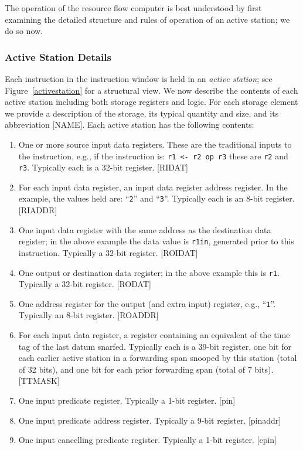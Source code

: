 \documentclass[10pt,dvips]{article}
\begin{document}
The operation of the resource flow computer is best understood by first
examining the detailed structure and rules of operation of an active station;
we do so now.


\subsubsection{Active Station Details}
Each instruction in the instruction window is held in an {\it active
station}; see Figure~\ref{activestation} for a structural view. We now describe the
contents of each active station including both storage registers and logic. For each
storage element we provide a description of the storage, its typical quantity and
size, and its abbreviation [NAME].
Each active station has the following contents:
\begin{enumerate}
\item One or more source input data registers. These are the traditional inputs to the
instruction, e.g., if the instruction is: {\tt r1 <- r2 op r3} these are {\tt r2}
and {\tt r3}.
Typically each is a 32-bit register.
[RIDAT]
\item For each input data register, an input data register address register. In the
example, the values held are: ``{\tt 2}'' and ``{\tt 3}''.
Typically each is an 8-bit register. [RIADDR]
\item One input data register with the same address as the destination data register;
in the above example the data value is {\tt r1in}, generated prior to
this instruction. Typically a 32-bit register. [ROIDAT]
\item One output or destination data register; in the above example this is {\tt r1}.
Typically a 32-bit register. [RODAT]
\item One address register for the output (and extra input) register, e.g., ``{\tt 1}''.
Typically an 8-bit register. [ROADDR]
\item For each input data register, a register containing an equivalent of the
time tag of the last datum snarfed. Typically each is a 39-bit register, one bit for
each earlier active station in a forwarding span snooped by this station
(total of 32 bits), and one bit for each prior forwarding span (total of 7 bits). [TTMASK]
\item One input predicate register. Typically a 1-bit register. [pin]
\item One input predicate address register. Typically a 9-bit register. [pinaddr]
\item One input cancelling predicate register. Typically a 1-bit register. [cpin]

\end{enumerate}
\end{document}
